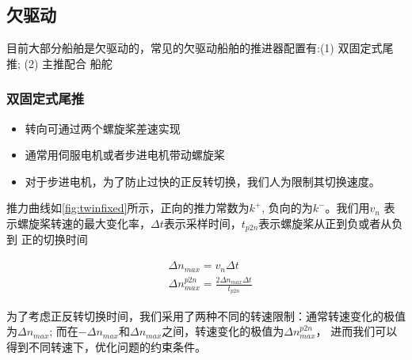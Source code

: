 \subsection{欠驱动}
目前大部分船舶是欠驱动的，常见的欠驱动船舶的推进器配置有:(1) 双固定式尾推; (2) 主推配合
船舵
\subsubsection{双固定式尾推}
\begin{itemize}
	\item 转向可通过两个螺旋桨差速实现
	\item 通常用伺服电机或者步进电机带动螺旋桨
	\item 对于步进电机，为了防止过快的正反转切换，我们人为限制其切换速度。
\end{itemize}

推力曲线如\ref{fig:twinfixed}所示，正向的推力常数为$k^+$, 负向的为$k^-$。我们用$v_n$
表示螺旋桨转速的最大变化率，$\Delta t$表示采样时间，$t_{p2n}$表示螺旋桨从正到负或者从负到
正的切换时间

\begin{equation}
  \begin{aligned}
    & \Delta n_{max} = v_n \Delta t \\
    & \Delta n_{max}^{p2n} = \frac{2 \Delta n_{max} \Delta t}{t_{p2n}}
  \end{aligned}
\end{equation}

为了考虑正反转切换时间，我们采用了两种不同的转速限制：通常转速变化的极值为$\Delta n_{max}$;
而在$-\Delta n_{max}$和$\Delta n_{max}$之间，转速变化的极值为$\Delta n_{max}^{p2n} $，
进而我们可以得到不同转速下，优化问题的约束条件。

